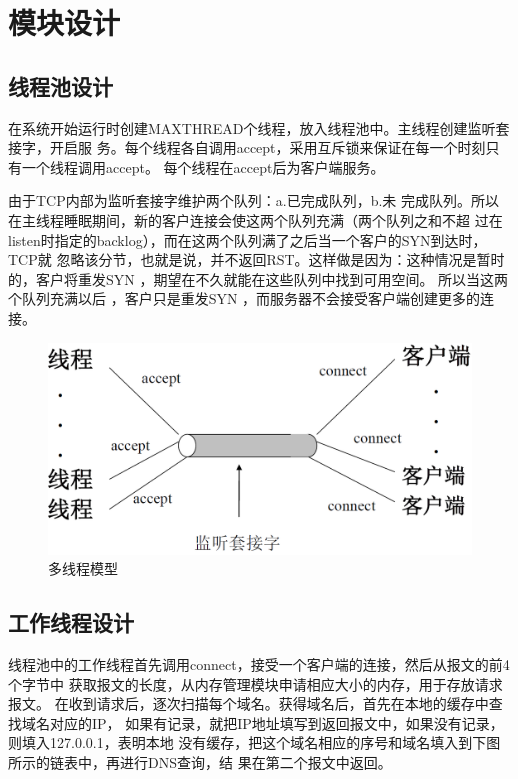 

\section{模块设计}
\subsection{线程池设计} 
在系统开始运行时创建MAXTHREAD个线程，放入线程池中。主线程创建监听套接字，开启服
务。每个线程各自调用accept，采用互斥锁来保证在每一个时刻只有一个线程调用accept。
每个线程在accept后为客户端服务。
\par{由于TCP内部为监听套接字维护两个队列：a.已完成队列，b.未
完成队列。所以在主线程睡眠期间，新的客户连接会使这两个队列充满（两个队列之和不超
过在listen时指定的backlog），而在这两个队列满了之后当一个客户的SYN到达时，TCP就
忽略该分节，也就是说，并不返回RST。这样做是因为：这种情况是暂时的，客户将重发SYN
，期望在不久就能在这些队列中找到可用空间\cite{unpv1}。 所以当这两个队列充满以后
，客户只是重发SYN ，而服务器不会接受客户端创建更多的连接。}
\begin{figure}[H]
\centering
\includegraphics[keepaspectratio, scale=0.4]{pitures/xianchengmoxing.png}
\caption{多线程模型} 
\end{figure}
\subsection{工作线程设计}

线程池中的工作线程首先调用connect，接受一个客户端的连接，然后从报文的前4个字节中
获取报文的长度，从内存管理模块申请相应大小的内存，用于存放请求报文。
在收到请求后，逐次扫描每个域名。获得域名后，首先在本地的缓存中查找域名对应的IP，
如果有记录，就把IP地址填写到返回报文中，如果没有记录，则填入127.0.0.1，表明本地
没有缓存，把这个域名相应的序号和域名填入到下图所示的链表中，再进行DNS查询，结
果在第二个报文中返回。

